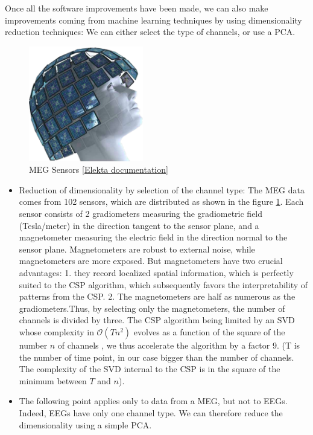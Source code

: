 Once all the software improvements have been made, we can also make improvements coming from machine learning techniques by using dimensionality reduction techniques: We can either select the type of channels, or use a PCA.

\begin{figure}[ht]
    \centering
    \includegraphics[width=5cm]{images_report/sensor/sensors_elekta.png}
    \caption[MEG Sensors]%
    {MEG Sensors [\href{https://www.elekta.com/dam/jcr:ed6d88e7-cd3e-478e-9c4a-3f89ef90ec92/Elekta-Neuromag-TRIUX-Brochure.pdf}{Elekta documentation}]}
    \label{sensors_elekta}
\end{figure}

\begin{itemize}
    \item Reduction of dimensionality by selection of the channel type: The MEG data comes from 102 sensors, which are distributed as shown in the figure \ref{sensors_elekta}. Each sensor consists of 2 gradiometers measuring the gradiometric field (Tesla/meter) in the direction tangent to the sensor plane, and a magnetometer measuring the electric field in the direction normal to the sensor plane. Magnetometers are robust to external noise, while magnetometers are more exposed. But magnetometers have two crucial advantages: 1. they record localized spatial information, which is perfectly suited to the CSP algorithm, which subsequently favors the interpretability of patterns from the CSP. 2. The magnetometers are half as numerous as the gradiometers.Thus, by selecting only the magnetometers, the number of channels is divided by three.  The CSP algorithm being limited by an SVD whose complexity in $\mathcal{O}(T n^2)$ evolves as a function of the square of the number $n$ of channels \cite{dhillonalan}, we thus accelerate the algorithm by a factor 9. (T is the number of time point, in our case bigger than the number of channels. The complexity of the SVD internal to the CSP is in the square of the minimum between $T$ and $n$).
    \item The following point applies only to data from a MEG, but not to EEGs. Indeed, EEGs have only one channel type. We can therefore reduce the dimensionality using a simple PCA.
\end{itemize}


